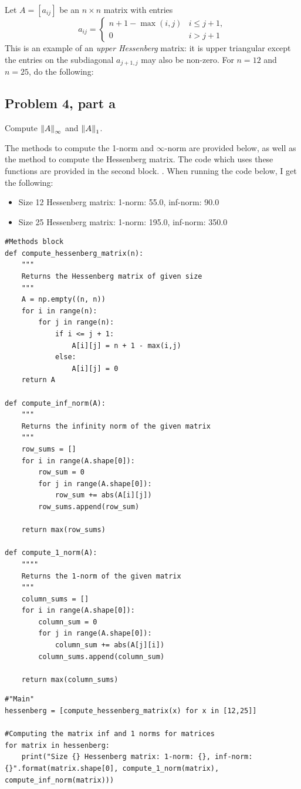 Let $A = [a_{ij}]$ be an $n \times n$ matrix with entries
\[
a_{ij} = 
\begin{cases}
    n + 1 - \max (i, j) &i \leq j + 1, \\
    0   & i > j + 1
\end{cases}
\]
This is an example of an \textit{upper Hessenberg} matrix: it is upper triangular except the entries on the subdiagonal $a_{j + 1, j}$ may also be non-zero. For $n = 12$ and $n = 25$, do the following:

\subsection{Problem 4, part a}
Compute $\norm{A}_\infty$ and $\norm{A}_1$.
\partbreak
\begin{solution}

    The methods to compute the 1-norm and $\infty$-norm are provided below, as well as the method to compute the Hessenberg matrix. The code which uses these functions are provided in the second block. . When running the code below, I get the following:
    \begin{itemize}
        \item Size 12 Hessenberg matrix: 1-norm: 55.0, inf-norm: 90.0
        \item Size 25 Hessenberg matrix: 1-norm: 195.0, inf-norm: 350.0
    \end{itemize}
    
\begin{lstlisting}
#Methods block
def compute_hessenberg_matrix(n):
    """
    Returns the Hessenberg matrix of given size
    """
    A = np.empty((n, n))
    for i in range(n):
        for j in range(n):
            if i <= j + 1:
                A[i][j] = n + 1 - max(i,j)
            else:
                A[i][j] = 0
    return A

def compute_inf_norm(A):
    """
    Returns the infinity norm of the given matrix 
    """
    row_sums = []
    for i in range(A.shape[0]):
        row_sum = 0
        for j in range(A.shape[0]):
            row_sum += abs(A[i][j])
        row_sums.append(row_sum)
    
    return max(row_sums)

def compute_1_norm(A):
    """"
    Returns the 1-norm of the given matrix
    """
    column_sums = []
    for i in range(A.shape[0]):
        column_sum = 0
        for j in range(A.shape[0]):
            column_sum += abs(A[j][i])
        column_sums.append(column_sum)
    
    return max(column_sums)

\end{lstlisting}
\begin{lstlisting}
#"Main"
hessenberg = [compute_hessenberg_matrix(x) for x in [12,25]]

#Computing the matrix inf and 1 norms for matrices
for matrix in hessenberg:
    print("Size {} Hessenberg matrix: 1-norm: {}, inf-norm: {}".format(matrix.shape[0], compute_1_norm(matrix), compute_inf_norm(matrix)))
\end{lstlisting}
\end{solution}

